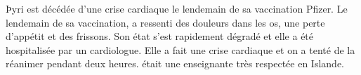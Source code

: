 Þyri est décédée d'une crise cardiaque le lendemain de sa vaccination Pfizer. Le
lendemain de sa vaccination,  a ressenti des douleurs dans les os, une
perte d'appétit et des frissons. Son état s'est rapidement dégradé et elle a été
hospitalisée par un cardiologue. Elle a fait une crise cardiaque et on a tenté
de la réanimer pendant deux heures.  était une enseignante très
respectée en Islande.

